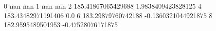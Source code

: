 0 nan nan
1 nan nan
2 185.41867065429688 1.9838409423828125
4 183.43482971191406 0.0
6 183.29879760742188 -0.1360321044921875
8 182.9595489501953 -0.47528076171875
